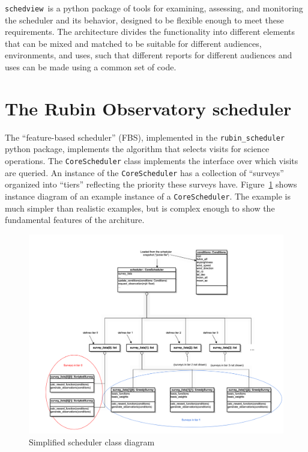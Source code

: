 \documentclass[OPS,lsstdraft,authoryear,toc]{lsstdoc}
\newcommand\schedview{\texttt{schedview }}
\begin{document}
\schedview is a python package of tools for examining, assessing, and monitoring the scheduler and its behavior, designed to be flexible enough to meet these requirements. The architecture divides the functionality into different elements that can be mixed and matched to be suitable for different audiences, environments, and uses, such that different reports for different audiences and uses can be made using a common set of code.

\section{The Rubin Observatory scheduler} \label{sec:scheduler}

The ``feature-based scheduler'' (FBS), implemented in the \texttt{rubin\_scheduler} python package, implements the algorithm that selects visits for science operations. The \texttt{CoreScheduler} class implements the interface over which visits are queried. An instance of the \texttt{CoreScheduler} has a collection of ``surveys'' organized into ``tiers'' reflecting the priority these surveys have. Figure~\ref{fig:schedclass} shows instance diagram of an example instance of a \texttt{CoreScheduler}. The example is much simpler than realistic examples, but is complex enough to show the fundamental features of the architure.


\begin{figure}
    \centering
    \includegraphics[width=1.0\linewidth]{schedclass.png}
    \caption{Simplified scheduler class diagram}
    \label{fig:schedclass}
\end{figure}
\end{document}
